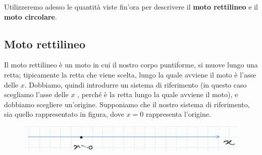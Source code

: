 Utilizzeremo adesso le quantità viste fin'ora per descrivere il \textbf{moto rettilineo} e il \textbf{moto circolare}.

\subsection{Moto rettilineo}
Il moto rettilineo è un moto in cui il nostro corpo puntiforme, si muove lungo una retta; tipicamente la retta che viene scelta, lungo la quale avviene il moto è l'asse delle $ x $.
Dobbiamo, quindi introdurre un sistema di riferimento (in questo caso scegliamo l'asse delle $ x $ , perché è la retta lungo la quale avviene il moto), e dobbiamo scegliere un'origine.
\newpage
Supponiamo che il nostro sistema di riferimento, sia quello rappresentato in figura, dove $ x = 0 $ rappresenta l'origine.

\begin{figure}[h]
\begin{center}
\includegraphics[width = 0.5 \textwidth]{lezione2/images/rettilineo1}
\label{fig:rettilineo1}
\end{center}
\end{figure}




